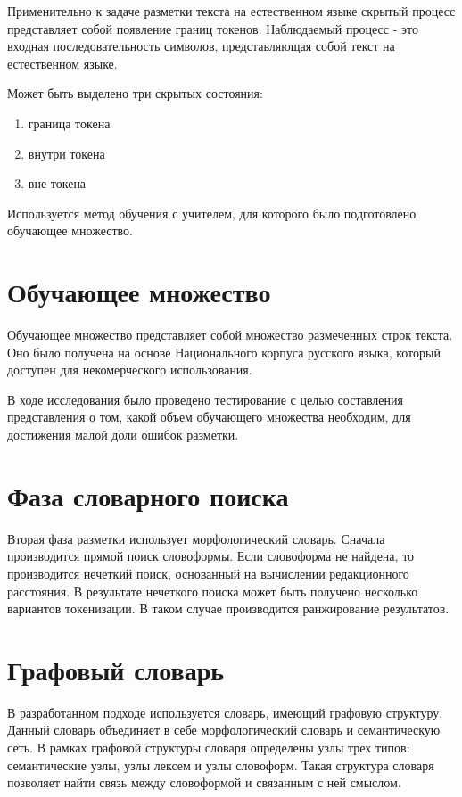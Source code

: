 \documentclass[14pt]{extarticle}
\begin{document}
Применительно к задаче разметки текста на естественном языке скрытый процесс представляет собой появление границ токенов. Наблюдаемый процесс - это входная последовательность символов, представляющая собой текст на естественном языке.

Может быть выделено три скрытых состояния:
\begin{enumerate}
	\item 
	граница токена
	\item
	внутри токена
	\item
	вне токена
\end{enumerate}

Используется метод обучения с учителем, для которого было подготовлено обучающее множество.

\section{Обучающее множество}
Обучающее множество представляет собой множество размеченных строк текста. Оно было получена на основе Национального корпуса русского языка, который доступен для некомерческого использования.

В ходе исследования было проведено тестирование с целью составления представления о том, какой объем обучающего множества необходим, для достижения малой доли ошибок разметки.

\section{Фаза словарного поиска}
Вторая фаза разметки использует морфологический словарь.
Сначала производится прямой поиск словоформы. 
Если словоформа не найдена, то производится нечеткий поиск, основанный на вычислении редакционного расстояния.
В результате нечеткого поиска может быть получено несколько вариантов токенизации. В таком случае производится ранжирование результатов.

\section{Графовый словарь}
В разработанном подходе используется словарь, имеющий графовую структуру.  Данный словарь объединяет в себе морфологический словарь и семантическую сеть. В рамках графовой структуры словаря определены узлы трех типов: семантические узлы, узлы лексем и узлы словоформ. Такая структура словаря позволяет найти связь между словоформой и связанным с ней смыслом. 
\end{document}
